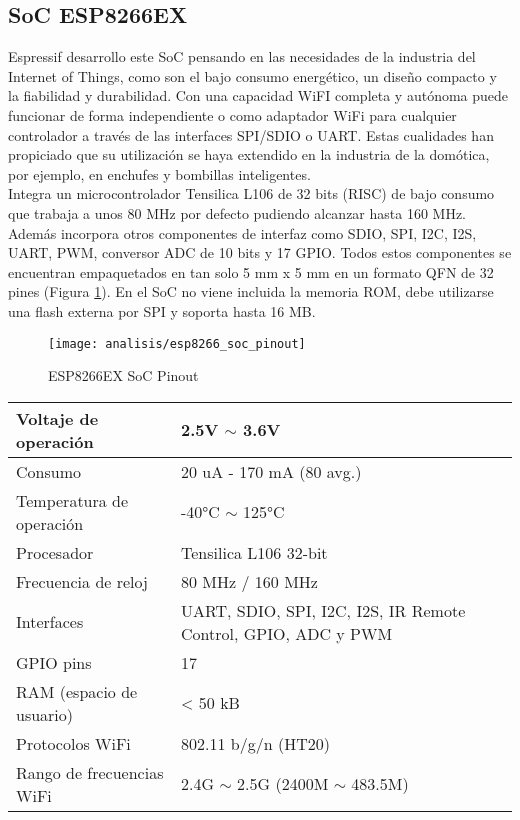 \documentclass[../proyecto.tex]{subfiles}
\begin{document}
\subsection{SoC ESP8266EX}
Espressif desarrollo este SoC pensando en las necesidades de la industria del Internet of Things, como son el bajo consumo energético, un diseño compacto y la fiabilidad y durabilidad. Con una capacidad WiFI completa y autónoma puede funcionar de forma independiente o como adaptador WiFi para cualquier controlador a través de las interfaces SPI/SDIO o UART. Estas cualidades han propiciado que su utilización se haya extendido en la industria de la domótica, por ejemplo, en enchufes y bombillas inteligentes. \\

Integra un microcontrolador Tensilica L106 de 32 bits (RISC) de bajo consumo que trabaja a unos 80 MHz por defecto pudiendo alcanzar hasta 160 MHz. Además incorpora otros componentes de interfaz como SDIO, SPI, I2C, I2S, UART, PWM, conversor ADC de 10 bits y 17 GPIO. Todos estos componentes se encuentran empaquetados en tan solo 5 mm x 5 mm en un formato QFN de 32 pines (Figura \ref{fig:esp8266_soc_pinout}). En el SoC no viene incluida la memoria ROM, debe utilizarse una flash externa por SPI y soporta hasta 16 MB. \cite{esp8266_datasheet}\\


\begin{figure}[h!]
\centering
\texttt{[image: analisis/esp8266\_soc\_pinout]}
\caption{ESP8266EX SoC Pinout}
\label{fig:esp8266_soc_pinout}
\end{figure}

\begin{center}
\begin{tabular}{ |l|m{20em}| }
\hline
Voltaje de operación      & 2.5V $\sim$ 3.6V          \\ \hline
Consumo                   & 20 uA - 170 mA (80 avg.)  \\ \hline
Temperatura de operación  & -40°C $\sim$ 125°C        \\ \hline
Procesador                & Tensilica L106 32-bit     \\ \hline
Frecuencia de reloj       & 80 MHz / 160 MHz          \\ \hline
Interfaces                & UART, SDIO, SPI, I2C, I2S, IR Remote Control, GPIO, ADC y PWM                           \\ \hline
GPIO pins                 & 17                        \\ \hline
RAM (espacio de usuario)  & < 50 kB                     \\ \hline
Protocolos WiFi           & 802.11 b/g/n (HT20)       \\ \hline
Rango de frecuencias WiFi & 2.4G $\sim$ 2.5G (2400M $\sim$ 483.5M) \\ \hline
\end{tabular}
\end{center}
\end{document}
